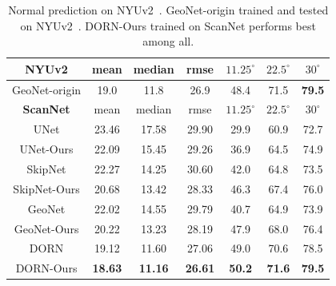 \begin{table}
    \centering
    \tabcolsep=0.07cm
    \small
    \begin{tabular}{|c|c|c|c||c|c|c|}
        \hline
         \textbf{NYUv2} & mean & median & rmse & $11.25^\circ$ & $22.5^\circ$ & $30^\circ$\\
         \hline
         GeoNet-origin & 19.0 & 11.8 & 26.9 & 48.4 & 71.5 & \textbf{79.5}\\
         \hline
         \hline
         \textbf{ScanNet} & mean & median & rmse & $11.25^\circ$ & $22.5^\circ$ & $30^\circ$\\
         \hline
         UNet & 23.46 & 17.58 & 29.90 & 29.9 & 60.9 & 72.7\\
         \hline
         UNet-Ours & 22.09 & 15.45 & 29.26 & 36.9 & 64.5 & 74.9\\
         \hline
         SkipNet & 22.27 & 14.25 & 30.60 & 42.0 & 64.8 & 73.5\\
         \hline
         SkipNet-Ours & 20.68 & 13.42 & 28.33 & 46.3 & 67.4 & 76.0\\
         \hline
         GeoNet & 22.02 & 14.55 & 29.79 & 40.7 & 64.9 & 73.9\\
         \hline
         GeoNet-Ours & 20.22 & 13.23 & 28.19 & 47.9 & 68.0 & 76.4\\
         \hline
         DORN & 19.12 & 11.60 & 27.06 & 49.0 & 70.6 & 78.5\\
         \hline
         DORN-Ours & \textbf{18.63} & \textbf{11.16} & \textbf{26.61} & \textbf{50.2} & \textbf{71.6} & \textbf{79.5}\\
         \hline         
    \end{tabular}
    \caption{Normal prediction on NYUv2~\cite{eigen2014depth}. GeoNet-origin trained and tested on NYUv2~\cite{qi2018geonet}.  DORN-Ours trained on ScanNet performs best among all.}
    \label{tab:framenet-vis-nyu}
\vspace{-0.1in}
\end{table}

